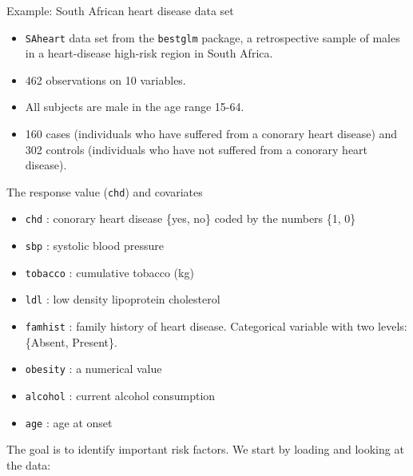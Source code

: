 \documentclass[
  10pt,
  ignorenonframetext,
]{beamer}
\providecommand{\tightlist}{%
  \setlength{\itemsep}{0pt}\setlength{\parskip}{0pt}}
\begin{document}
\begin{frame}[fragile]
\begin{block}{Example: South African heart disease data set}
\protect\hypertarget{example-south-african-heart-disease-data-set}{}
\(~\)

\begin{itemize}
\tightlist
\item
  \texttt{SAheart} data set from the \texttt{bestglm} package, a
  retrospective sample of males in a heart-disease high-risk region in
  South Africa.
\end{itemize}

\vspace{2mm}

\begin{itemize}
\tightlist
\item
  462 observations on 10 variables.
\end{itemize}

\vspace{2mm}

\begin{itemize}
\tightlist
\item
  All subjects are male in the age range 15-64.
\end{itemize}

\vspace{2mm}

\begin{itemize}
\tightlist
\item
  160 cases (individuals who have suffered from a conorary heart
  disease) and 302 controls (individuals who have not suffered from a
  conorary heart disease).
\end{itemize}
\end{block}
\end{frame}

\begin{frame}[fragile]
The response value (\texttt{chd}) and covariates

\begin{itemize}
\tightlist
\item
  \texttt{chd} : conorary heart disease \{yes, no\} coded by the numbers
  \{1, 0\}
\item
  \texttt{sbp} : systolic blood pressure\\
\item
  \texttt{tobacco} : cumulative tobacco (kg)\\
\item
  \texttt{ldl} : low density lipoprotein cholesterol
\item
  \texttt{famhist} : family history of heart disease. Categorical
  variable with two levels: \{Absent, Present\}.
\item
  \texttt{obesity} : a numerical value
\item
  \texttt{alcohol} : current alcohol consumption
\item
  \texttt{age} : age at onset
\end{itemize}

The goal is to identify important risk factors. We start by loading and
looking at the data:
\end{frame}
\end{document}
